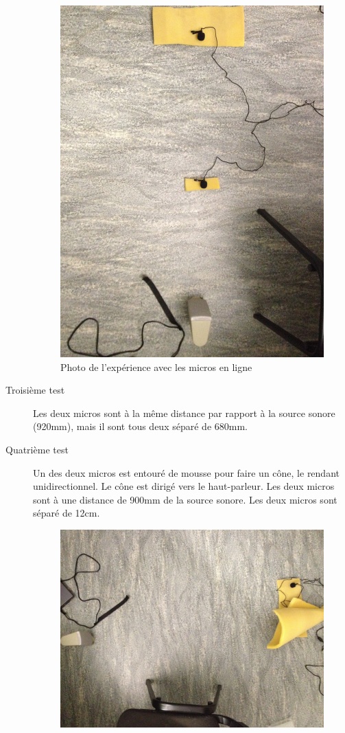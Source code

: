 \documentclass[12pt,a4paper]{report}
\begin{document}
\begin{description}
\begin{figure}[H]
	\includegraphics[width=\textwidth]{../donnees11-03/test_2.jpg} 
	\caption{Photo de l'expérience avec les micros en ligne}
	\end{figure}
\item[Troisième test] Les deux micros sont à la même distance par rapport à la source sonore (920mm), mais il sont tous deux séparé de 680mm.
\item[Quatrième test] Un des deux micros est entouré de mousse pour faire un cône, le rendant unidirectionnel. Le cône est dirigé vers le haut-parleur. Les deux micros sont à une distance de 900mm de la source sonore. Les deux micros sont séparé de 12cm.
	\begin{figure}[H]
	\includegraphics[width=\textwidth]{../donnees11-03/test_4.jpg} 

\end{figure}
\end{description}
\end{document}
